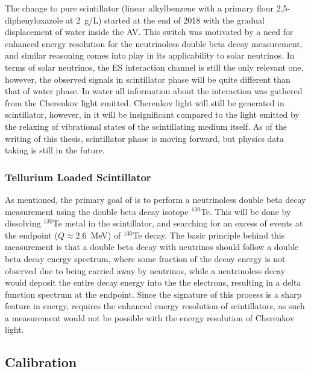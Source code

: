 The change to pure scintillator {\labppo} (linear alkylbenzene with a primary flour 2,5-diphenyloxazole at 2~g/L) started at the end of 2018 with the gradual displacement of water inside the AV.
This switch was motivated by a need for enhanced energy resolution for the neutrinoless double beta decay measurement, and similar reasoning comes into play in its applicability to solar neutrinos.
In terms of solar neutrinos, the ES interaction channel is still the only relevant one, however, the observed signals in scintillator phase will be quite different than that of water phase.
In water all information about the interaction was gathered from the Cherenkov light emitted. 
Cherenkov light will still be generated in scintillator, however, in {\labppo} it will be insignificant compared to the light emitted by the relaxing of vibrational states of the scintillating medium itself.
As of the writing of this thesis, scintillator phase is moving forward, but physics data taking is still in the future.

\subsubsection{Tellurium Loaded Scintillator}
As mentioned, the primary goal of {\snop} is to perform a neutrinoless double beta decay measurement using the double beta decay isotope $^{130}$Te.
This will be done by dissolving $^{130}$Te metal in the {\labppo} scintillator, and searching for an excess of events at the endpoint ($Q \approx 2.6$~MeV) of $^{130}$Te decay.
The basic principle behind this measurement is that a double beta decay with neutrinos should follow a double beta decay energy spectrum, where some fraction of the decay energy is not observed due to being carried away by neutrinos, while a neutrinoless decay would deposit the entire decay energy into the the electrons, resulting in a delta function spectrum at the endpoint.
Since the signature of this process is a sharp feature in energy, {\snop} requires the enhanced energy resolution of scintillators, as such a measurement would not be possible with the energy resolution of Cherenkov light.

\subsection{Calibration}

